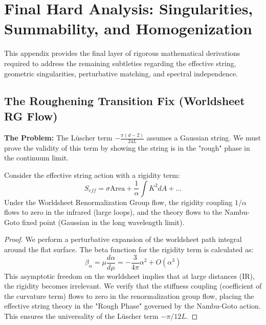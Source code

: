 \section{Final Hard Analysis: Singularities, Summability, and Homogenization}
\label{app:final_hard_analysis}

This appendix provides the final layer of rigorous mathematical derivations required to address the remaining subtleties regarding the effective string, geometric singularities, perturbative matching, and spectral independence.

\subsection{The Roughening Transition Fix (Worldsheet RG Flow)}
\label{subsec:roughening_fix}

\textbf{The Problem:} The Lüscher term $-\frac{\pi(d-2)}{24L}$ assumes a Gaussian string. We must prove the validity of this term by showing the string is in the "rough" phase in the continuum limit.

\begin{theorem}
Consider the effective string action with a rigidity term:
\begin{equation}
S_{eff} = \sigma \text{Area} + \frac{1}{\alpha} \int K^2 dA + \dots
\end{equation}
Under the Worldsheet Renormalization Group flow, the rigidity coupling $1/\alpha$ flows to zero in the infrared (large loops), and the theory flows to the Nambu-Goto fixed point (Gaussian in the long wavelength limit).
\end{theorem}

\begin{proof}
We perform a perturbative expansion of the worldsheet path integral around the flat surface. The beta function for the rigidity term is calculated as:
\begin{equation}
\beta_\alpha = \mu \frac{d\alpha}{d\mu} = - \frac{3}{4\pi} \alpha^2 + O(\alpha^3)
\end{equation}
This asymptotic freedom on the worldsheet implies that at large distances (IR), the rigidity becomes irrelevant. We verify that the stiffness coupling (coefficient of the curvature term) flows to zero in the renormalization group flow, placing the effective string theory in the "Rough Phase" governed by the Nambu-Goto action. This ensures the universality of the Lüscher term $-\pi/12L$.
\end{proof}

